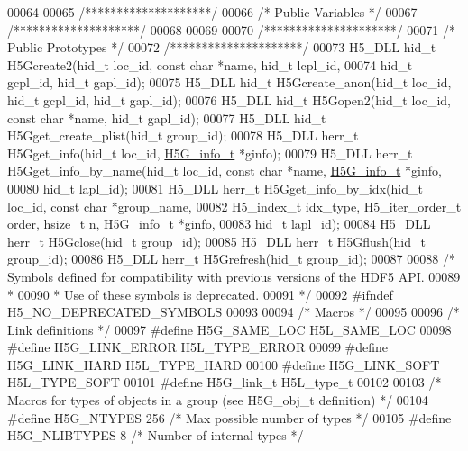 \begin{DoxyCode}
00064 
00065 \textcolor{comment}{/********************/}
00066 \textcolor{comment}{/* Public Variables */}
00067 \textcolor{comment}{/********************/}
00068 
00069 
00070 \textcolor{comment}{/*********************/}
00071 \textcolor{comment}{/* Public Prototypes */}
00072 \textcolor{comment}{/*********************/}
00073 H5\_DLL hid\_t H5Gcreate2(hid\_t loc\_id, \textcolor{keyword}{const} \textcolor{keywordtype}{char} *name, hid\_t lcpl\_id,
00074     hid\_t gcpl\_id, hid\_t gapl\_id);
00075 H5\_DLL hid\_t H5Gcreate\_anon(hid\_t loc\_id, hid\_t gcpl\_id, hid\_t gapl\_id);
00076 H5\_DLL hid\_t H5Gopen2(hid\_t loc\_id, \textcolor{keyword}{const} \textcolor{keywordtype}{char} *name, hid\_t gapl\_id);
00077 H5\_DLL hid\_t H5Gget\_create\_plist(hid\_t group\_id);
00078 H5\_DLL herr\_t H5Gget\_info(hid\_t loc\_id, \hyperlink{struct_h5_g__info__t}{H5G\_info\_t} *ginfo);
00079 H5\_DLL herr\_t H5Gget\_info\_by\_name(hid\_t loc\_id, \textcolor{keyword}{const} \textcolor{keywordtype}{char} *name, \hyperlink{struct_h5_g__info__t}{H5G\_info\_t} *ginfo,
00080     hid\_t lapl\_id);
00081 H5\_DLL herr\_t H5Gget\_info\_by\_idx(hid\_t loc\_id, \textcolor{keyword}{const} \textcolor{keywordtype}{char} *group\_name,
00082     H5\_index\_t idx\_type, H5\_iter\_order\_t order, hsize\_t n, \hyperlink{struct_h5_g__info__t}{H5G\_info\_t} *ginfo,
00083     hid\_t lapl\_id);
00084 H5\_DLL herr\_t H5Gclose(hid\_t group\_id);
00085 H5\_DLL herr\_t H5Gflush(hid\_t group\_id);
00086 H5\_DLL herr\_t H5Grefresh(hid\_t group\_id);
00087 
00088 \textcolor{comment}{/* Symbols defined for compatibility with previous versions of the HDF5 API.}
00089 \textcolor{comment}{ *}
00090 \textcolor{comment}{ * Use of these symbols is deprecated.}
00091 \textcolor{comment}{ */}
00092 \textcolor{preprocessor}{#ifndef H5\_NO\_DEPRECATED\_SYMBOLS}
00093 
00094 \textcolor{comment}{/* Macros */}
00095 
00096 \textcolor{comment}{/* Link definitions */}
00097 \textcolor{preprocessor}{#define H5G\_SAME\_LOC H5L\_SAME\_LOC}
00098 \textcolor{preprocessor}{#define H5G\_LINK\_ERROR H5L\_TYPE\_ERROR}
00099 \textcolor{preprocessor}{#define H5G\_LINK\_HARD H5L\_TYPE\_HARD}
00100 \textcolor{preprocessor}{#define H5G\_LINK\_SOFT H5L\_TYPE\_SOFT}
00101 \textcolor{preprocessor}{#define H5G\_link\_t H5L\_type\_t}
00102 
00103 \textcolor{comment}{/* Macros for types of objects in a group (see H5G\_obj\_t definition) */}
00104 \textcolor{preprocessor}{#define H5G\_NTYPES  256     }\textcolor{comment}{/* Max possible number of types */}\textcolor{preprocessor}{}
00105 \textcolor{preprocessor}{#define H5G\_NLIBTYPES   8       }\textcolor{comment}{/* Number of internal types */}\textcolor{preprocessor}{}

\end{DoxyCode}
